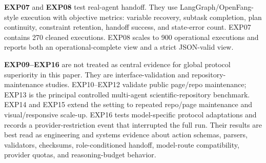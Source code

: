 \documentclass[11pt]{article}
\begin{document}
\textbf{EXP07} and \textbf{EXP08} test real-agent handoff. They use LangGraph/OpenFang-style execution with objective metrics: variable recovery, subtask completion, plan continuity, constraint retention, handoff success, and state-error count. EXP07 contains 270 cleaned executions. EXP08 scales to 900 operational executions and reports both an operational-complete view and a strict JSON-valid view.

\textbf{EXP09--EXP16} are not treated as central evidence for global protocol superiority in this paper. They are interface-validation and repository-maintenance studies. EXP10--EXP12 validate public page/repo maintenance; EXP13 is the principal controlled multi-agent scientific-repository benchmark. EXP14 and EXP15 extend the setting to repeated repo/page maintenance and visual/responsive scale-up. EXP16 tests model-specific protocol adaptations and records a provider-restriction event that interrupted the full run. Their results are best read as engineering and systems evidence about action schemas, parsers, validators, checksums, role-conditioned handoff, model-route compatibility, provider quotas, and reasoning-budget behavior.
\end{document}

